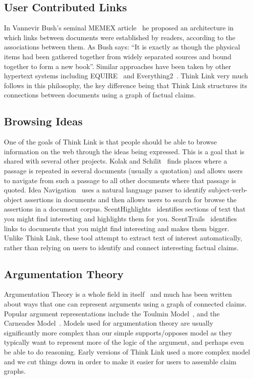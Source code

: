 \documentclass{chi2009}
\begin{document}
\subsection{User Contributed Links}

In Vannevir Bush's seminal MEMEX article~\cite{memex} he proposed an architecture in which links between documents were established by readers, according to the associations between them. As Bush says: ``It is exactly as though the physical items had been gathered together from widely separated sources and bound together to form a new book''. Similar approaches have been taken by other hypertext systems including EQUIRE~\cite{enquire} and Everything2~\cite{everything2}. Think Link very much follows in this philosophy, the key difference being that Think Link structures its connections between documents using a graph of factual claims.

\subsection{Browsing Ideas}

One of the goals of Think Link is that people should be able to browse information on the web through the ideas being expressed. This is a goal that is shared with several other projects. Kolak and Schilit~\cite{quotations,quotationsdl} finds places where a passage is repeated in several documents (usually a quotation) and allows users to navigate from such a passage to all other documents where that passage is quoted. Idea Navigation~\cite{ideanavigation} uses a natural language parser to identify subject-verb-object assertions in documents and then allows users to search for browse the assertions in a document corpus. ScentHighlights~\cite{scenthighlights} identifies sections of text that you might find interesting and highlights them for you. ScentTrails~\cite{scenttrails} identifies links to documents that you might find interesting and makes them bigger. Unlike Think Link, these tool attempt to extract text of interest automatically, rather than relying on users to identify and connect interesting factual claims.


\subsection{Argumentation Theory}

Argumentation Theory is a whole field in itself~\cite{argumentation,argmas} and much has been written about ways that one can represent arguments using a graph of connected claims. Popular argument representations include the Toulmin Model~\cite{toulmin}, and the Carneades Model~\cite{carneades}. Models used for argumentation theory are usually significantly more complex than our simple supports/opposes model as they typically want to represent more of the logic of the argument, and perhaps even be able to do reasoning. Early versions of Think Link used a more complex model and we cut things down in order to make it easier for users to assemble claim graphs.
\end{document}
